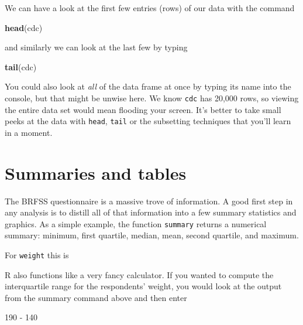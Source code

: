 \documentclass[]{book}
\newenvironment{Shaded}{\begin{snugshade}}{\end{snugshade}}
\newcommand{\KeywordTok}[1]{\textcolor[rgb]{0.13,0.29,0.53}{\textbf{{#1}}}}
\newcommand{\DecValTok}[1]{\textcolor[rgb]{0.00,0.00,0.81}{{#1}}}
\newcommand{\StringTok}[1]{\textcolor[rgb]{0.31,0.60,0.02}{{#1}}}
\newcommand{\NormalTok}[1]{{#1}}
\theoremstyle{definition}
\theoremstyle{definition}
\theoremstyle{definition}
\theoremstyle{remark}
\begin{document}
We can have a look at the first few entries (rows) of our data with the
command

\begin{Shaded}
\begin{Highlighting}[]
\KeywordTok{head}\NormalTok{(cdc)}
\end{Highlighting}
\end{Shaded}

and similarly we can look at the last few by typing

\begin{Shaded}
\begin{Highlighting}[]
\KeywordTok{tail}\NormalTok{(cdc)}
\end{Highlighting}
\end{Shaded}

You could also look at \emph{all} of the data frame at once by typing
its name into the console, but that might be unwise here. We know
\texttt{cdc} has 20,000 rows, so viewing the entire data set would mean
flooding your screen. It's better to take small peeks at the data with
\texttt{head}, \texttt{tail} or the subsetting techniques that you'll
learn in a moment.

\section{Summaries and tables}\label{summaries-and-tables}

The BRFSS questionnaire is a massive trove of information. A good first
step in any analysis is to distill all of that information into a few
summary statistics and graphics. As a simple example, the function
\texttt{summary} returns a numerical summary: minimum, first quartile,
median, mean, second quartile, and maximum.

For \texttt{weight} this is

\begin{Shaded}
\end{Shaded}

R also functions like a very fancy calculator. If you wanted to compute
the interquartile range for the respondents' weight, you would look at
the output from the summary command above and then enter

\begin{Shaded}
\begin{Highlighting}[]
\DecValTok{190} \NormalTok{-}\StringTok{ }\DecValTok{140}
\end{Highlighting}
\end{Shaded}
\end{document}
